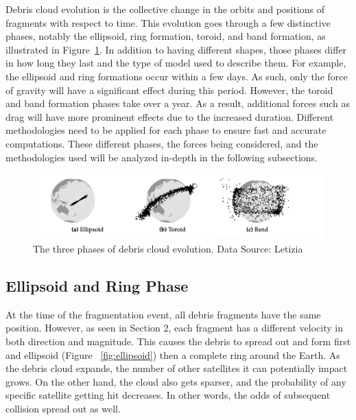 \documentclass[a4paper, 12pt]{article}
\begin{document}
Debris cloud evolution is the collective change in the orbits and positions of fragments with respect to time. This evolution goes through a few distinctive phases, notably the ellipsoid,  ring formation, toroid, and band formation, as illustrated in Figure~\ref{fig:debrisphases}. In addition to having different shapes, those phases differ in how long they last and the type of model used to describe them. For example, the ellipsoid and ring formations occur within a few days. As such, only the force of gravity  will have a significant effect during this period.  However, the toroid and band formation phases take over a year. As a result, additional forces such as drag will have more prominent effects due to the increased duration. Different methodologies need to be applied for each phase to ensure fast and accurate computations. These different phases, the forces being considered, and the methodologies used will be analyzed in-depth in the following subsections.
\vspace{\baselineskip}

\begin{figure}[h]
	\centering
	\includegraphics[scale=0.45]{debrisphases}
	\caption{The three phases of debris cloud evolution. Data Source: Letizia}
	\label{fig:debrisphases}
\end{figure}


\subsection{Ellipsoid and Ring Phase}

At the time of the fragmentation event, all debris fragments have the same position. However, as seen in Section 2, each fragment has a different velocity in both direction and magnitude. This causes the debris to spread out and form first and ellipsoid (Figure ~\ref{fig:ellipsoid}) then a complete ring around the Earth. As the debris cloud expands, the number of other satellites it can potentially impact grows. On the other hand, the cloud also gets sparser, and the probability of any specific satellite getting hit decreases. In other words, the odds of subsequent collision spread out as well.
\end{document}
